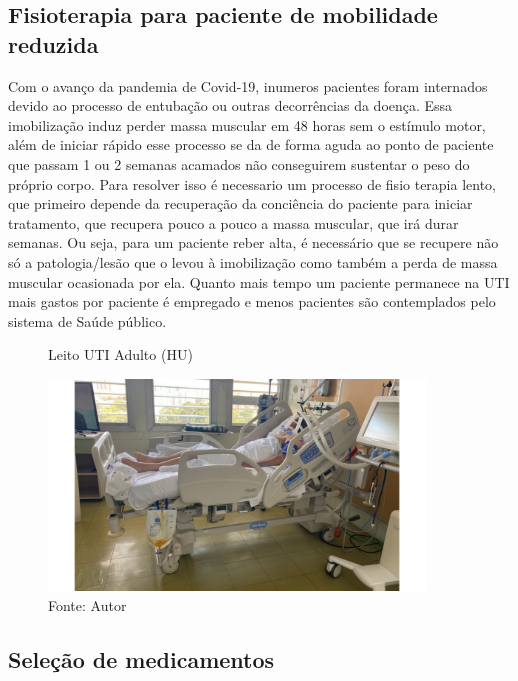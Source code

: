 \documentclass[../poliXuniversity_hospital_(USP)_report.tex]{subfiles}
\begin{document}
\subsection{Fisioterapia para paciente de mobilidade reduzida}

Com o avanço da pandemia de Covid-19, inumeros pacientes foram internados devido ao processo de entubação ou outras decorrências da doença. Essa imobilização induz perder massa muscular em 48 horas sem o estímulo motor, além de iniciar rápido esse processo se da de forma aguda ao ponto de paciente que passam 1 ou 2 semanas acamados não conseguirem sustentar o peso do próprio corpo. Para resolver isso é necessario um processo de fisio terapia lento, que primeiro depende da recuperação da conciência do paciente para iniciar tratamento, que recupera pouco a pouco a massa muscular, que irá durar semanas. Ou seja, para um paciente reber alta, é necessário que se recupere não só a patologia/lesão que o levou à imobilização como também a perda de massa muscular ocasionada por ela. Quanto mais tempo um paciente permanece na UTI mais gastos por paciente é empregado e menos pacientes são contemplados pelo sistema de Saúde público.
\begin{figure}[h]
\centering
\caption{Leito UTI Adulto (HU)}
\centering %
\includegraphics[width=10cm]{images/uti_1.png}
\caption*{Fonte: Autor}
\label{figura: Leito UTI Adulto (HU)}
\end{figure}

\subsection{Seleção de medicamentos}
\end{document}
